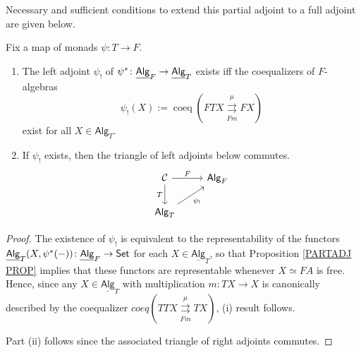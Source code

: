 \documentclass[a4paper,10pt
]{article}%
\renewcommand{\1}{\eta}%
\newcommand{\Alg}{\underline{\mathsf{Alg}}}
\begin{document}
Necessary and sufficient conditions to extend this partial adjoint to a full adjoint are given below.
\begin{corollary}
	\label{ALGLEFTEX_COR}
	Fix a map of monads $\psi \colon T \to F$.
	\begin{enumerate}[label = (\roman*)]
		\item The left adjoint $\psi_!$ of $\psi^{\**} \colon \Alg_F \to \Alg_T$ exists iff the coequalizers of $F$-algebras
		\[
		\psi_!(X):= \mathop{coeq}\left( FTX \overset{\mu}{\underset{Fm}{\rightrightarrows}} FX \right)
		\]
		exist for all $X \in \mathsf{Alg}_T$.
		\item If $\psi_!$ exists, then the triangle of left adjoints below commutes.
		\[
		\begin{tikzcd}
		\mathcal C \arrow[d, "T"'] \arrow[r, "F"]
		&
		\mathsf{Alg}_F
		\\
		\mathsf{Alg}_T \arrow[ur, "{\psi_!}"']
		\end{tikzcd}
		\]           
	\end{enumerate}
\end{corollary}
\begin{proof}
	The existence of $\psi_!$ is equivalent to the representability of the functors 
	$\Alg_T(X,\psi^{\**}(-))\colon \Alg_{F} \to \mathsf{Set}$
	for each $X \in \Alg_T$,
	so that Proposition \ref{PARTADJ PROP} implies that these functors are representable whenever $X \simeq FA$ is free.
	Hence, since any $X \in \Alg_T$
	with multiplication $m \colon TX \to X$
	is canonically described by the coequalizer %
	$coeq \left(
	T T X 
	\overset{\mu}{\underset{Fm}{\rightrightarrows}}
	T X
	\right)$,
	(i) result follows.
	
	Part (ii) follows since the associated triangle of right adjoints commutes.
\end{proof}



\end{document}
